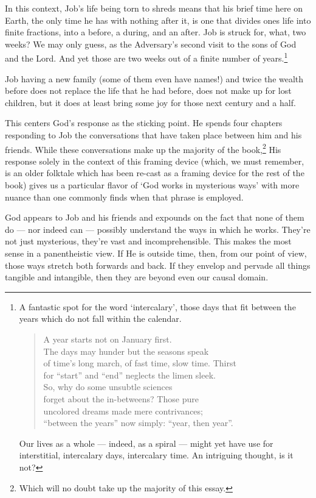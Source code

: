 In this context, Job's life being torn to shreds means that his brief time here on Earth, the only time he has with nothing after it, is one that divides ones life into finite fractions, into a before, a during, and an after. Job is struck for, what, two weeks? We may only guess, as the Adversary's second visit to the sons of God and the Lord. And yet those are two weeks out of a finite number of years.\footnote{A fantastic spot for the word `intercalary', those days that fit between the years which do not fall within the calendar.

  \begin{verse}
  A year starts not on January first.\\
  \vin The days may hunder but the seasons speak\\
  of time's long march, of fast time, slow time. Thirst\\
  \vin for ``start'' and ``end'' neglects the limen sleek.\\
  So, why do some unsubtle sciences\\
  \vin forget about the in-betweens? Those pure\\
  uncolored dreams made mere contrivances;\\
  \vin ``between the years'' now simply: ``year, then year''.

  \parencite[3]{eigengrau}
  \end{verse}

  Our lives as a whole --- indeed, as a spiral --- might yet have use for interstitial, intercalary days, intercalary time. An intriguing thought, is it not?}

Job having a new family (some of them even have names!) and twice the wealth before does not replace the life that he had before, does not make up for lost children, but it does at least bring some joy for those next century and a half.

This centers God's response as the sticking point. He spends four chapters responding to Job the conversations that have taken place between him and his friends. While these conversations make up the majority of the book,\footnote{Which will no doubt take up the majority of this essay.} His response solely in the context of this framing device (which, we must remember, is an older folktale which has been re-cast as a framing device for the rest of the book) gives us a particular flavor of `God works in mysterious ways' with more nuance than one commonly finds when that phrase is employed.

God appears to Job and his friends and expounds on the fact that none of them do --- nor indeed can --- possibly understand the ways in which he works. They're not just mysterious, they're vast and incomprehensible. This makes the most sense in a panentheistic view. If He is outside time, then, from our point of view, those ways stretch both forwards and back. If they envelop and pervade all things tangible and intangible, then they are beyond even our causal domain.

